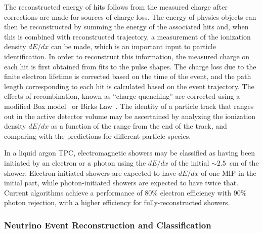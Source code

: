 The reconstructed energy of hits follows from the measured charge
after corrections are made for sources of charge loss.  The energy of
physics objects can then be reconstructed by summing the energy of the
associated hits and, when this is combined with reconstructed
trajectory, a measurement of the ionization density $dE/dx$ can be
made, which is an important input to particle identification.  In
order to reconstruct this information, the measured charge on each hit
is first obtained from fits to the pulse shapes.  The charge loss due
to the finite electron lifetime is corrected based on the time of the
event, and the path length corresponding to each hit is calculated
based on the event trajectory.  The effects of recombination, known as
``charge quenching'' are corrected using a modified Box
model~\cite{Thomas:1987zz} or Birks Law~\cite{Birks:1964zz}.  The
identity of a particle track that ranges out in the active detector
volume may be ascertained by analyzing the ionization density $dE/dx$
as a function of the range from the end of the track, and comparing
with the predictions for different particle species.

In a liquid argon TPC, electromagnetic showers may be classified as
having been initiated by an electron or a photon using the $dE/dx$ of
the initial $\sim 2.5$~cm of the shower.  Electron-initiated showers
are expected to have $dE/dx$ of one MIP in the initial part, while
photon-initiated showers are expected to have twice that.  Current
algorithms achieve a performance of 80\% electron efficiency with 90\%
photon rejection, with a higher efficiency for fully-reconstructed
showers.



\subsubsection{Neutrino Event Reconstruction and Classification}

